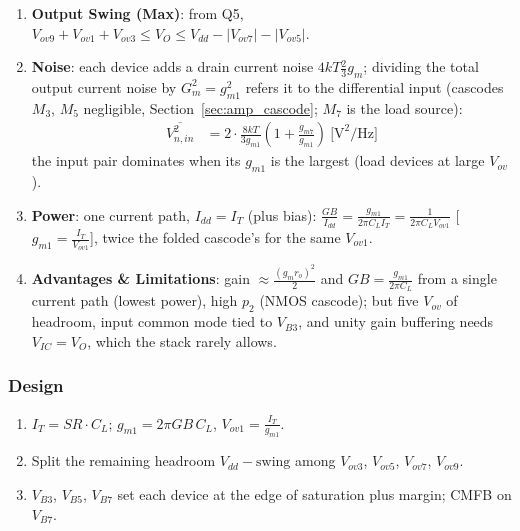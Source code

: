 \begin{enumerate}
    \paragraph{At Input:} \(I_G = 0\): \(Z_{in} \to \infty\) at DC.
    \paragraph{At Output:} \(Z_{out} = Z_{dn} \parallel Z_{up} \approx \frac{g_m r_o^2}{2}\) per side.
  \item \textbf{Output Swing (Max)}: from Q5, \(V_{ov9} + V_{ov1} + V_{ov3} \leq V_{O} \leq V_{dd} - |V_{ov7}| - |V_{ov5}|\).
  \item \textbf{Noise}: each device adds a drain current noise \(4kT\frac{2}{3}g_m\); dividing the total output
    current noise by \(G_m^2 = g_{m1}^2\) refers it to the differential input (cascodes \(M_3\), \(M_5\) negligible, Section~\ref{sec:amp_cascode}; \(M_7\) is the load source):
    \begin{align*}
      \overline{V_{n,in}^2} &= 2\cdot\frac{8kT}{3 g_{m1}}\left(1 + \frac{g_{m7}}{g_{m1}}\right) \ \text{[V}^2\text{/Hz]}
    \end{align*}
    the input pair dominates when its \(g_{m1}\) is the largest (load devices at large \(V_{ov}\)).
  \item \textbf{Power}: one current path, \(I_{dd} = I_T\) (plus bias): \(\frac{GB}{I_{dd}} = \frac{g_{m1}}{2\pi C_L I_T} = \frac{1}{2\pi C_L V_{ov1}}\)
    [\(g_{m1} = \frac{I_T}{V_{ov1}}\)], twice the folded cascode's for the same \(V_{ov1}\).
  \item \textbf{Advantages \& Limitations}: gain \(\approx \frac{(g_m r_o)^2}{2}\) and \(GB = \frac{g_{m1}}{2\pi C_L}\)
    from a single current path (lowest power), high \(p_2\) (NMOS cascode); but five \(V_{ov}\)
    of headroom, input common mode tied to \(V_{B3}\), and unity gain buffering needs
    \(V_{IC} = V_O\), which the stack rarely allows.
\end{enumerate}

\subsubsection{Design}
\begin{enumerate}
  \item \(I_T = SR \cdot C_L\); \(g_{m1} = 2\pi GB\, C_L\), \(V_{ov1} = \frac{I_T}{g_{m1}}\).
  \item Split the remaining headroom \(V_{dd} - \text{swing}\) among \(V_{ov3}\), \(V_{ov5}\), \(V_{ov7}\), \(V_{ov9}\).
  \item \(V_{B3}\), \(V_{B5}\), \(V_{B7}\) set each device at the edge of saturation plus margin; CMFB on \(V_{B7}\).
\end{enumerate}

